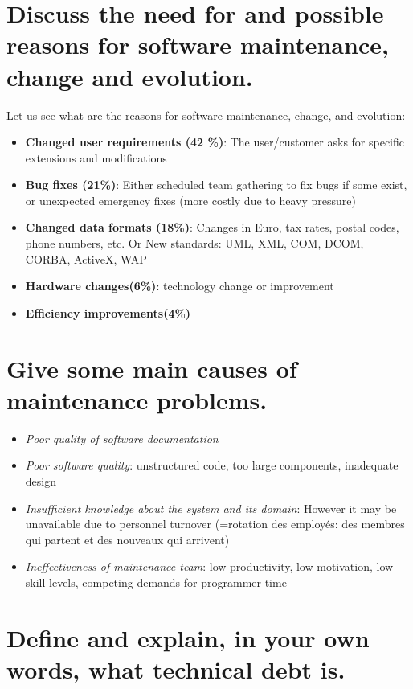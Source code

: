 \section{Discuss the need for and possible reasons for software maintenance, change and evolution.}

Let us see what are the reasons for software maintenance, change, and evolution:
\begin{itemize}
\item \textbf{Changed user requirements (42 \%)}: The user/customer asks for specific extensions and modifications
\item \textbf{Bug fixes (21\%)}: Either scheduled team gathering to fix bugs if some exist, or unexpected emergency fixes (more costly due to heavy pressure)
\item \textbf{Changed data formats (18\%)}: Changes in Euro, tax rates, postal codes, phone numbers, etc. Or New standards: UML, XML, COM, DCOM, CORBA, ActiveX, WAP
\item \textbf{Hardware changes(6\%)}: technology change or improvement
\item \textbf{Efficiency improvements(4\%)}
\end{itemize}


\section{Give some main causes of maintenance problems.}

\begin{itemize}
\item \textit{Poor quality of software documentation}
\item \textit{Poor software quality}: unstructured code, too large components, inadequate design
\item \textit{Insufficient knowledge about the system and its domain}: However it may be unavailable due to personnel turnover (=rotation des employés: des membres qui partent et des nouveaux qui arrivent)
\item \textit{Ineffectiveness of maintenance team}: low productivity, low motivation, low skill levels, competing demands for programmer time
\end{itemize}


\section{Define and explain, in your own words, what technical debt is.}

